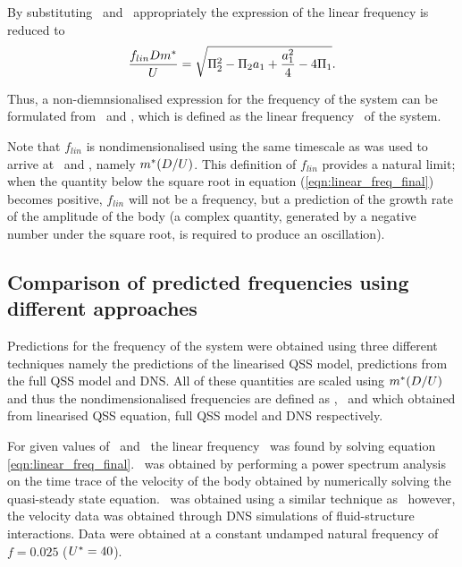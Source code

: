 By substituting \massstiff\ and \massdamp\ appropriately the expression of the linear frequency is reduced to   
\begin{equation}
\label{eqn:linear_freq_final-1}
\frac{f_{lin}Dm^{*}}{U} = \sqrt{\Pi_2^2 - \Pi_2a_1 + \frac{a_1^2}{4} - 4\Pi_1}.
\end{equation}

Thus, a non-diemnsionalised expression for the frequency of the system can be formulated from \massstiff\ and \massdamp, which is defined as the linear frequency  \freqlin\ of the system.

Note that $f_{lin}$ is nondimensionalised using the same timescale as was used to arrive at \massstiff\ and \massdamp, namely $m^{*}(D/U)$. This definition of $f_{lin}$ provides a natural limit; when the quantity below the square root in equation (\ref{eqn:linear_freq_final}) becomes positive, $f_{lin}$ will not be a frequency, but a prediction of the growth rate of the amplitude of the body (a complex quantity, generated by a negative number under the square root, is required to produce an oscillation).

\subsection{Comparison of predicted frequencies using different approaches}

Predictions for the frequency of the system were obtained using three different techniques namely the predictions of the linearised QSS model, predictions from the full QSS model and DNS. All of these quantities are scaled using $m^{*}(D/U)$ and thus the nondimensionalised frequencies are defined as  \freqlin, \freqqss\ and \freqdns which obtained from  linearised QSS equation, full QSS model and DNS respectively.  


 For given values of \massstiff\ and \massdamp\, the linear frequency \freqlin\ was found by solving equation \ref{eqn:linear_freq_final}. \freqqss\ was obtained by performing a power spectrum analysis on the time trace of the velocity of the body  obtained by numerically solving the quasi-steady state equation. \freqdns\ was obtained using a similar technique as \freqqss\ however, the velocity data was obtained through DNS simulations of fluid-structure interactions. Data were obtained at a constant undamped natural frequency of $f=0.025$ ($U^{*}=40$).



